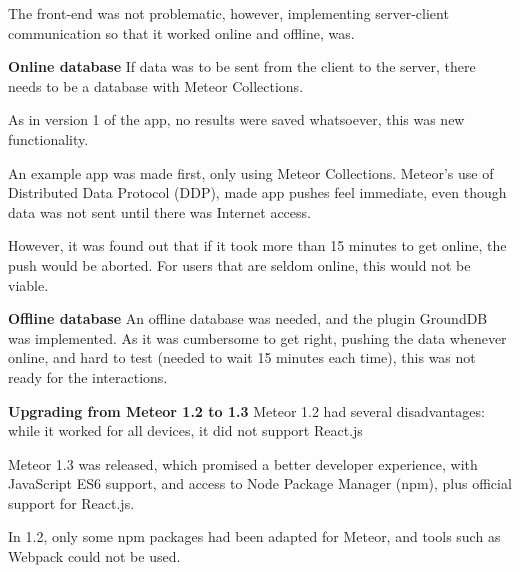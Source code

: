 The front-end was not problematic, however, implementing server-client communication so that it worked online and offline, was.



\textbf{Online database}
If data was to be sent from the client to the server, there needs to be a database with Meteor Collections.

As in version 1 of the app, no results were saved whatsoever, this was new functionality.

An example app was made first, only using Meteor Collections. Meteor's use of Distributed Data Protocol (DDP), made app pushes feel immediate, even though data was not sent until there was Internet access.

However, it was found out that if it took more than 15 minutes to get online, the push would be aborted. For users that are seldom online, this would not be viable.

\textbf{Offline database}
An offline database was needed, and the plugin GroundDB was implemented. As it was cumbersome to get right, pushing the data whenever online, and hard to test (needed to wait 15 minutes each time), this was not ready for the interactions.

\textbf{Upgrading from Meteor 1.2 to 1.3}
Meteor 1.2 had several disadvantages: while it worked for all devices, it did not support React.js

Meteor 1.3 was released, which promised a better developer experience, with JavaScript ES6 support, and access to Node Package Manager (npm), plus official support for React.js.

In 1.2, only some npm packages had been adapted for Meteor, and tools such as Webpack could not be used.

